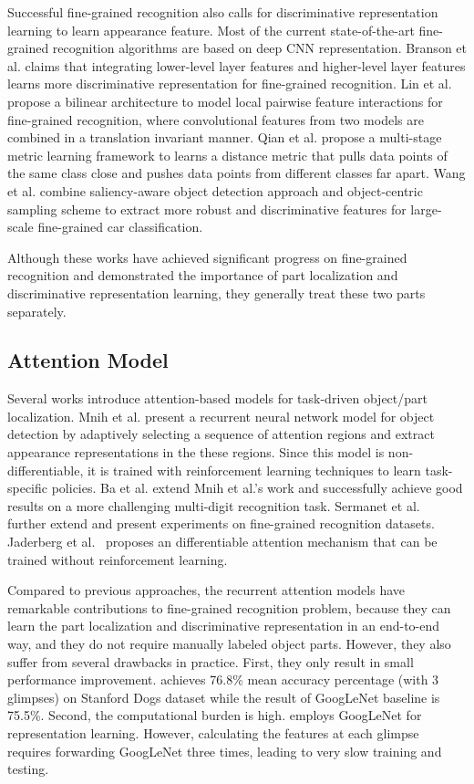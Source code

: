 \documentclass[10pt,twocolumn,letterpaper]{article}
\begin{document}
Successful fine-grained recognition also calls for discriminative representation learning to learn appearance feature.
Most of the current state-of-the-art fine-grained recognition algorithms are based on deep CNN representation.
Branson et al. \cite{bd15} claims that integrating lower-level layer features and higher-level layer features learns more discriminative representation for fine-grained recognition.
Lin et al. \cite{bd16} propose a bilinear architecture to model local pairwise feature interactions for fine-grained recognition, where convolutional features from two models are combined in a translation invariant manner.
Qian et al. \cite{bd17} propose a multi-stage metric learning framework to learns a distance metric that pulls data points of the same class close and pushes data points from different classes far apart.
Wang et al. \cite{bd18} combine saliency-aware object detection approach and object-centric sampling scheme to extract more robust and discriminative features for large-scale fine-grained car classification.

Although these works have achieved significant progress on fine-grained recognition and demonstrated the importance of part localization and discriminative representation learning, they generally treat these two parts separately.

\subsection{Attention Model}
Several works introduce attention-based models for task-driven object/part localization.
Mnih et al. \cite{bd1} present a recurrent neural network model for object detection by adaptively selecting a sequence of attention regions and extract appearance  representations in the these regions.
Since this model is non-differentiable, it  is trained with reinforcement learning techniques to learn  task-specific policies.
Ba et al. \cite{bd2} extend Mnih et al.'s work and successfully achieve good results on a more challenging multi-digit recognition task.
Sermanet et al.~\cite{bd3} further extend \cite{bd2} and present experiments on fine-grained recognition datasets.
Jaderberg et al.~\cite{jaderberg2015spatial} proposes an differentiable attention mechanism that can be trained without reinforcement learning.

Compared to previous approaches, the recurrent attention models \cite{bd1,bd2,bd3} have remarkable contributions to fine-grained recognition problem,
because they can learn the part localization and discriminative representation in an end-to-end way, and they do not require manually labeled object parts.
However, they also suffer from several drawbacks in practice. First, they only result in small performance improvement.
\cite{bd3}  achieves 76.8\% mean accuracy percentage (with 3 glimpses) on Stanford Dogs dataset while the result of GoogLeNet \cite{bd7} baseline is 75.5\%.
Second, the computational burden is high.
\cite{bd3} employs GoogLeNet for representation learning. However, calculating the features at each glimpse requires forwarding GoogLeNet three times, leading to very slow training and testing.
\end{document}
